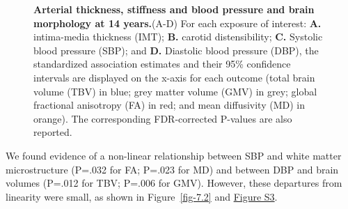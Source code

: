 \documentclass[
  letterpaper,
  DIV=11,
  numbers=noendperiod]{scrreport}
\begin{document}
\begin{figure}[H]


\caption{\label{fig-7.1}\textbf{Arterial thickness, stiffness and blood
pressure and brain morphology at 14 years.}\newline(A-D) For each
exposure of interest: \textbf{A.} intima-media thickness (IMT);
\textbf{B.} carotid distensibility; \textbf{C.} Systolic blood pressure
(SBP); and \textbf{D.} Diastolic blood pressure (DBP), the standardized
association estimates and their 95\% confidence intervals are displayed
on the x-axis for each outcome (total brain volume (TBV) in blue; grey
matter volume (GMV) in grey; global fractional anisotropy (FA) in red;
and mean diffusivity (MD) in orange). The corresponding FDR-corrected
P-values are also reported.}

\end{figure}%

We found evidence of a non-linear relationship between SBP and white
matter microstructure (P=.032 for FA; P=.023 for MD) and between DBP and
brain volumes (P=.012 for TBV; P=.006 for GMV). However, these
departures from linearity were small, as shown in Figure~\ref{fig-7.2}
and \href{https://osf.io/2f4sg}{Figure S3}.
\end{document}
